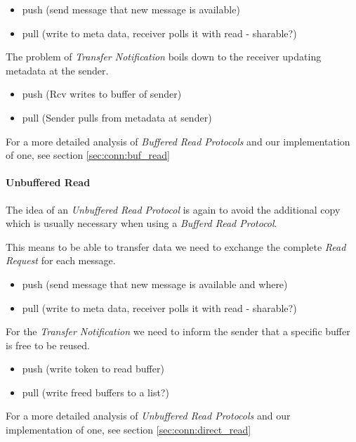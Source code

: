 \begin{itemize}
  \item push (send message that new message is available)
  \item pull (write to meta data, receiver polls it with read - sharable?)
\end{itemize}


The problem of \emph{Transfer Notification} boils down to the receiver updating metadata at the sender.

\begin{itemize}
  \item push (Rcv writes to buffer of sender)
  \item pull (Sender pulls from metadata at sender)
\end{itemize}

For a more detailed analysis of \emph{Buffered Read Protocols} and our implementation of one, see section \ref{sec:conn:buf_read}

\paragraph{Unbuffered Read}
The idea of an \emph{Unbuffered Read Protocol} is again to avoid the additional copy which is usually necessary when using a
\emph{Bufferd Read Protocol}. 

This means to be able to transfer data we need to exchange the complete \emph{Read Request} for each message. 

\begin{itemize}
  \item push (send message that new message is available and where)
  \item pull (write to meta data, receiver polls it with read - sharable?)
\end{itemize}

For the \emph{Transfer Notification} we need to inform the sender that a specific buffer is free to be reused.

\begin{itemize}
  \item push (write token to read buffer)
  \item pull (write freed buffers to a list?)
\end{itemize}

For a more detailed analysis of \emph{Unbuffered Read Protocols} and our implementation of one, see section \ref{sec:conn:direct_read}


